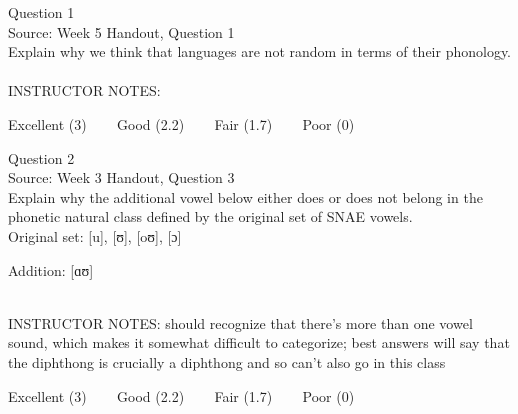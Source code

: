 \documentclass[12pt]{article}
\begin{document}
\begin{center}
\textbf{{\color{blue}{\HUGE START OF EXAM\\}}}

\textbf{{\color{blue}{\HUGE Student ID: 99594\\}}}

\textbf{{\color{blue}{\HUGE 4:50\\}}}

\end{center}
\newpage

{\large Question 1}\\

Source: Week 5 Handout, Question 1\\

Explain why we think that languages are not random in terms of their phonology.\\


~\\
INSTRUCTOR NOTES: 


\vfill
Excellent (3) ~~~ Good (2.2) ~~~ Fair (1.7) ~~~ Poor (0)
\newpage

{\large Question 2}\\

Source: Week 3 Handout, Question 3\\

Explain why the additional vowel below either does or does not belong in the phonetic natural class defined by the original set of SNAE vowels.\\

Original set: {[u]}, {[ʊ]}, {[oʊ]}, {[ɔ]}

Addition: {[ɑʊ]}


~\\
INSTRUCTOR NOTES: should recognize that there's more than one vowel sound, which makes it somewhat difficult to categorize; best answers will say that the diphthong is crucially a diphthong and so can't also go in this class


\vfill
Excellent (3) ~~~ Good (2.2) ~~~ Fair (1.7) ~~~ Poor (0)
\newpage

\begin{center}
\textbf{{\color{red}{\HUGE END OF EXAM}}}\\

\end{center}
\newpage
\end{document}
